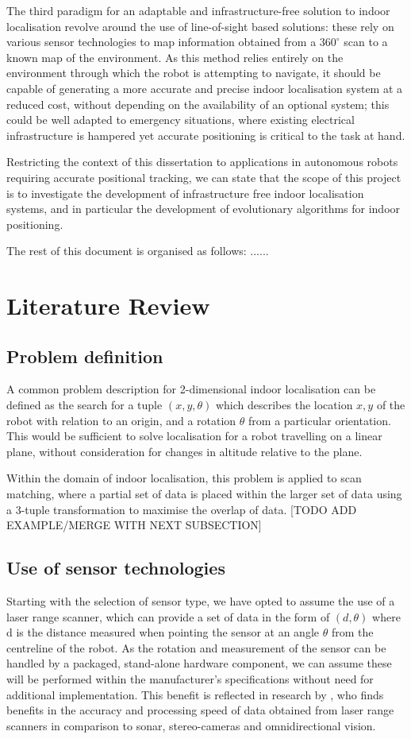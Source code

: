 \documentclass[authoryearcitations]{UoYCSproject}
\begin{document}
The third paradigm for an adaptable and infrastructure-free solution to indoor localisation revolve around the use of line-of-sight based solutions: these rely on various sensor technologies to map information obtained from a  $360^{\circ}$ scan to a known map of the environment. As this method relies entirely on the environment through which the robot is attempting to navigate, it should be capable of generating a more accurate and precise indoor localisation system at a reduced cost, without depending on the availability of an optional system; this could be well adapted to emergency situations, where existing electrical infrastructure is hampered yet accurate positioning is critical to the task at hand. 


Restricting the context of this dissertation to applications in autonomous robots requiring accurate positional tracking, we can state that the scope of this project is to investigate the development of infrastructure free indoor localisation systems, and in particular the development of evolutionary algorithms for indoor positioning.

The rest of this document is organised as follows: ......


\chapter{Literature Review}

\section{Problem definition}
A common problem description for 2-dimensional indoor localisation can be defined as the search for a tuple $(x, y, \theta)$ which describes the location $x, y$ of the robot with relation to an origin, and a rotation $\theta$ from a particular orientation. This would be sufficient to solve localisation for a robot travelling on a linear plane, without consideration for changes in altitude relative to the plane.

Within the domain of indoor localisation, this problem is applied to scan matching, where a partial set of data is placed within the larger set of data using a 3-tuple transformation to maximise the overlap of data. [TODO ADD EXAMPLE/MERGE WITH NEXT SUBSECTION]


\section{Use of sensor technologies}
Starting with the selection of sensor type, we have opted to assume the use of a laser range scanner, which can provide a set of data in the form of $(d, \theta)$ where d is the distance measured when pointing the sensor at an angle $\theta$ from the centreline of the robot. As the rotation and measurement of the sensor can be handled by a packaged, stand-alone hardware component, we can assume these will be performed within the manufacturer's specifications without need for additional implementation. This benefit is reflected in research by \citet{Lingemann2005-hm}, who finds benefits in the accuracy and processing speed of data obtained from laser range scanners in comparison to sonar, stereo-cameras and omnidirectional vision.
\end{document}
